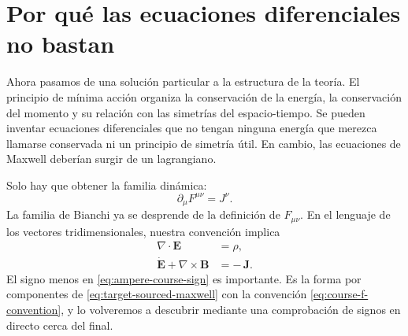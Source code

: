 \begin{classroomqa}
\end{classroomqa}

\begin{classroomqa}
\end{classroomqa}

\section{Por qué las ecuaciones diferenciales no bastan}

Ahora pasamos de una solución particular a la estructura de la teoría. El principio de mínima acción organiza la conservación de la energía, la conservación del momento y su relación con las simetrías del espacio-tiempo. Se pueden inventar ecuaciones diferenciales que no tengan ninguna energía que merezca llamarse conservada ni un principio de simetría útil. En cambio, las ecuaciones de Maxwell deberían surgir de un lagrangiano.

Solo hay que obtener la familia dinámica:
\begin{equation}
\partial_\mu F^{\mu\nu}=J^\nu.
\label{eq:target-sourced-maxwell}
\end{equation}
La familia de Bianchi ya se desprende de la definición de \(F_{\mu\nu}\). En el lenguaje de los vectores tridimensionales, nuestra convención implica
\begin{align}
\nabla\cdot\mathbf E&=\rho,
\label{eq:gauss-source}
\\
\dot{\mathbf E}+\nabla\times\mathbf B&=-\,\mathbf J.
\label{eq:ampere-course-sign}
\end{align}
El signo menos en \eqref{eq:ampere-course-sign} es importante. Es la forma por componentes de \eqref{eq:target-sourced-maxwell} con la convención \eqref{eq:course-f-convention}, y lo volveremos a descubrir mediante una comprobación de signos en directo cerca del final.

